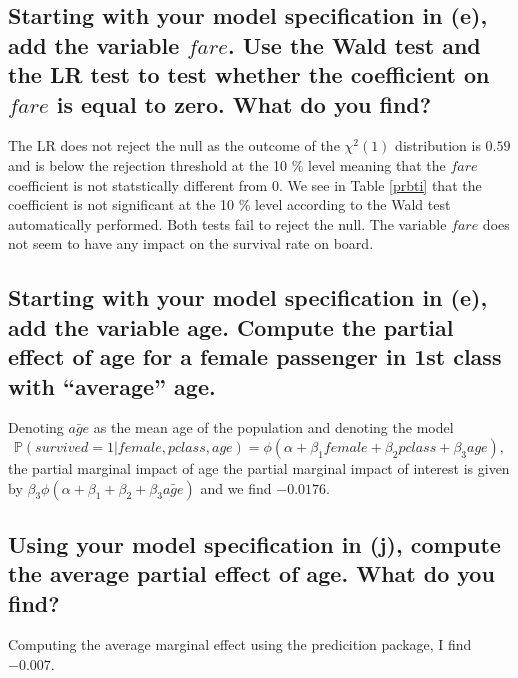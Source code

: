 \documentclass[12pt]{article}
\begin{document}
\subsection{Starting with your model specification in (e), add the variable $fare$. Use the Wald test and the LR test to test whether the coefficient on $fare$ is equal to zero. What do you find?}

The LR does not reject the null as the outcome of the $\chi^2(1)$ distribution is $0.59$ and is below the rejection threshold at the 10 \% level meaning that the $fare$ coefficient is not statstically different from 0. We see in Table \ref{prbti} that the coefficient is not significant at the 10 \% level according to the Wald test automatically performed. Both tests fail to reject the null. The variable $fare$ does not seem to have any impact on the survival rate on board.

\subsection{Starting with your model specification in (e), add the variable age. Compute the partial effect of age for a female passenger in 1st class with “average” age.}

Denoting $\bar{age}$ as the mean age of the population and denoting the model
$$\mathbb{P}(survived = 1 | female, pclass, age) = \phi(\alpha + \beta_1 female + \beta_2 pclass + \beta_3 age),$$ the partial marginal impact of age 
the partial marginal impact of interest is given by $\beta_3 \phi(\alpha + \beta_1 + \beta_2 + \beta_3 \bar{age})$ and we find $-0.0176$.

\subsection{Using your model specification in (j), compute the average partial effect of age. What do you find?}
Computing the average marginal effect using the predicition package, I find $-0.007$.
\end{document}
